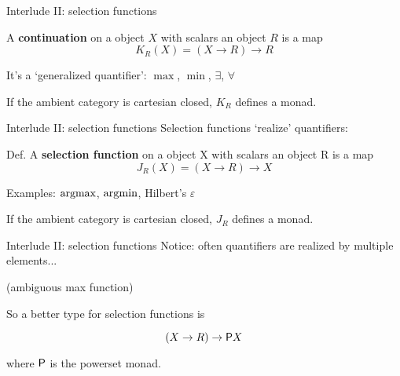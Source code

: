 \begin{frame}{Interlude II: selection functions}
	\begin{definition}
		A \textbf{continuation} on a object $X$ with scalars an object $R$ is a map
		\begin{equation*}
			K_R(X) = (X \to R) \to R
		\end{equation*}
	\end{definition}

	It's a `generalized quantifier': $\max$, $\min$, $\exists$, $\forall$

	If the ambient category is cartesian closed, $K_R$ defines a monad.
\end{frame}

\begin{frame}{Interlude II: selection functions}
	Selection functions `realize' quantifiers:

	\begin{definition}
		Def. A \textbf{selection function} on a object X with scalars an object R is a map
		\begin{equation*}
			J_R(X) = (X \to R) \to X
		\end{equation*}
	\end{definition}

	Examples: $\operatorname{argmax}$, $\operatorname{argmin}$, Hilbert's $\varepsilon$

	If the ambient category is cartesian closed, $J_R$ defines a monad.
\end{frame}

\begin{frame}{Interlude II: selection functions}
	Notice: often quantifiers are realized by multiple elements...

	(ambiguous max function)

	So a better type for selection functions is

	\begin{equation*}
		(X \to R) \to \mathsf{P} X
	\end{equation*}

	where $\mathsf{P}$ is the powerset monad.
\end{frame}

